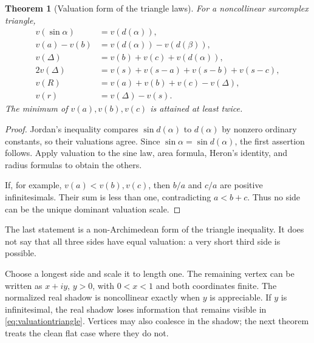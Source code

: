 \documentclass[11pt]{article}
\numberwithin{equation}{section}
\newtheorem{theorem}{Theorem}[section]
\theoremstyle{definition}
\begin{document}
\begin{theorem}[Valuation form of the triangle laws]\label{thm:valuationtriangle}
For a noncollinear surcomplex triangle,
\begin{align}
 v(\sin\alpha)&=v(d(\alpha)),\\
 v(a)-v(b)&=v(d(\alpha))-v(d(\beta)),\\
 v(\Delta)&=v(b)+v(c)+v(d(\alpha)),\\
 2v(\Delta)&=v(s)+v(s-a)+v(s-b)+v(s-c),\\
 v(R)&=v(a)+v(b)+v(c)-v(\Delta),\\
 v(r)&=v(\Delta)-v(s).
 \label{eq:valuationtriangle}
\end{align}
The minimum of $v(a),v(b),v(c)$ is attained at least twice.
\end{theorem}
\begin{proof}
Jordan's inequality compares $\sin d(\alpha)$ to $d(\alpha)$ by nonzero ordinary constants, so their valuations agree. Since $\sin\alpha=\sin d(\alpha)$, the first assertion follows. Apply valuation to the sine law, area formula, Heron's identity, and radius formulas to obtain the others.

If, for example, $v(a)<v(b),v(c)$, then $b/a$ and $c/a$ are positive infinitesimals. Their sum is less than one, contradicting $a<b+c$. Thus no side can be the unique dominant valuation scale.
\end{proof}
The last statement is a non-Archimedean form of the triangle inequality. It does not say that all three sides have equal valuation: a very short third side is possible.

Choose a longest side and scale it to length one. The remaining vertex can be written as $x+iy$, $y>0$, with $0<x<1$ and both coordinates finite. The normalized real shadow is noncollinear exactly when $y$ is appreciable. If $y$ is infinitesimal, the real shadow loses information that remains visible in \eqref{eq:valuationtriangle}. Vertices may also coalesce in the shadow; the next theorem treats the clean flat case where they do not.
\end{document}
